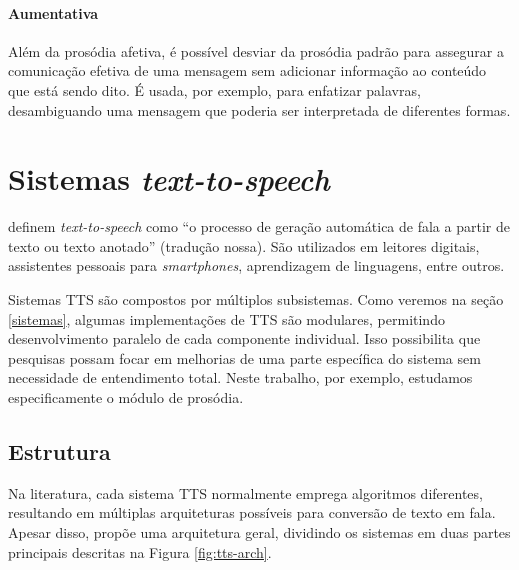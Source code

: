 \paragraph{Aumentativa} Além da prosódia afetiva, é possível desviar da prosódia
padrão para assegurar a comunicação efetiva de uma mensagem sem adicionar
informação ao conteúdo que está sendo dito. É usada, por exemplo, para
enfatizar palavras, desambiguando uma mensagem que poderia ser interpretada de
diferentes formas.

\section{Sistemas \emph{text-to-speech}}
 definem \emph{text-to-speech} como ``o processo de geração
automática de fala a partir de texto ou texto anotado'' (tradução nossa). São
utilizados em leitores digitais, assistentes pessoais para \emph{smartphones},
aprendizagem de linguagens, entre outros.

Sistemas TTS são compostos por múltiplos subsistemas. Como veremos na seção
\ref{sistemas}, algumas implementações de TTS são modulares, permitindo
desenvolvimento paralelo de cada componente individual. Isso possibilita que
pesquisas possam focar em melhorias de uma parte específica do sistema sem
necessidade de entendimento total. Neste trabalho, por exemplo, estudamos
especificamente o módulo de prosódia.

\subsection{Estrutura}
Na literatura, cada sistema TTS normalmente emprega algoritmos diferentes,
resultando em múltiplas arquiteturas possíveis para conversão de texto em fala.
Apesar disso,  propõe uma arquitetura geral, dividindo os
sistemas em duas partes principais descritas na Figura \ref{fig:tts-arch}.

